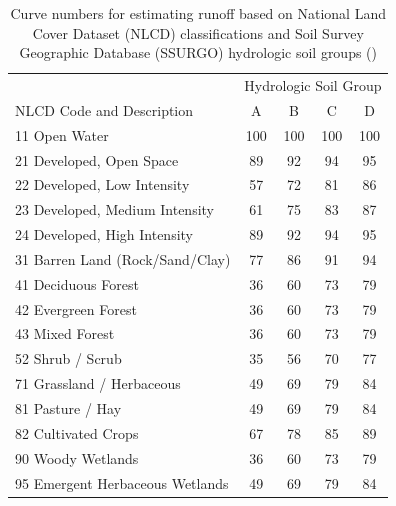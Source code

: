 \documentclass{article}
\begin{document}
	\begin{table}[h]
		\centering
		\begin{tabular}{lcccc}
			\multicolumn{1}{c}{ } & \multicolumn{4}{c}{Hydrologic Soil Group} \\
			NLCD Code and Description & A & B & C & D \\
			\hline
			11 Open Water & 100 & 100 & 100 & 100 \\
			21 Developed, Open Space & 89 & 92 & 94 & 95 \\
			22 Developed, Low Intensity & 57 & 72 & 81 & 86 \\
			23 Developed, Medium Intensity & 61 & 75 & 83 & 87 \\
			24 Developed, High Intensity & 89 & 92 & 94 & 95 \\
			31 Barren Land (Rock/Sand/Clay) & 77 & 86 & 91 & 94 \\
			41 Deciduous Forest & 36 & 60 & 73 & 79 \\
			42 Evergreen Forest & 36 & 60 & 73 & 79 \\
			43 Mixed Forest & 36 & 60 & 73 & 79 \\
			52 Shrub / Scrub & 35 & 56 & 70 & 77 \\
			71 Grassland / Herbaceous & 49 & 69 & 79 & 84 \\
			81 Pasture / Hay & 49 & 69 & 79 & 84 \\
			82 Cultivated Crops & 67 & 78 & 85 & 89 \\
			90 Woody Wetlands & 36 & 60 & 73 & 79 \\
			95 Emergent Herbaceous Wetlands & 49 & 69 & 79 & 84 \\
			\hline
		\end{tabular}
		\caption[Curve numbers for estimating runoff]{Curve numbers for estimating runoff based on National Land Cover Dataset (NLCD) classifications and Soil Survey Geographic Database (SSURGO) hydrologic soil groups (\cite{mcenroe_storm_2003})}
		\label{table:curveNumberTable}
	\end{table}
\clearpage
\end{document}
